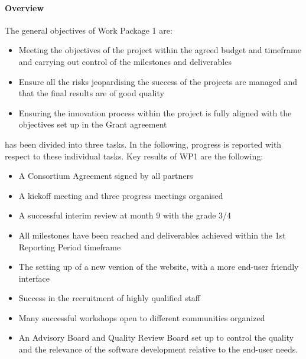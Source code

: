 
\paragraph{Overview}

The general objectives of Work Package 1 are:

\begin{itemize}
\item{Meeting the objectives of the project within the agreed budget and timeframe and carrying out control of the milestones and deliverables}
\item{Ensure all the risks jeopardising the success of the projects are managed and that the final results are of good quality}
\item{Ensuring the innovation process within the project is fully aligned with the objectives set up in the Grant agreement}
\end{itemize}

 has been divided into three tasks. In the following, progress is reported with respect to these individual tasks.
Key results of WP1 are the following:

\begin{itemize}
\item{A Consortium Agreement signed by all partners}
\item{A kickoff meeting and three progress meetings organised}
\item{A successful interim review at month 9 with the grade 3/4}
\item{All milestones have been reached and deliverables achieved within the 1st Reporting Period timeframe}
\item{The setting up of a new version of the \ODK website, with a more end-user friendly interface}
\item{Success in the recruitment of highly qualified staff}
\item{Many successful workshops open to different communities organized}
\item{An Advisory Board and Quality Review Board set up to control the quality and the relevance of the software development relative to the end-user needs.}
\end{itemize}

